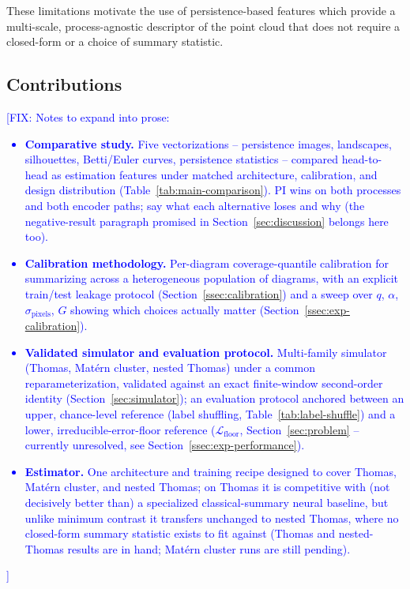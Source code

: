 \documentclass[11pt,letterpaper]{article}
\newcommand{\1}{\mathds{1}}
\newcommand{\fix}[1]{\textcolor{blue}{[FIX: #1]}}
\theoremstyle{plain}
\theoremstyle{definitioncolon}
\begin{document}
These limitations motivate the use of persistence-based features which provide a
multi-scale, process-agnostic descriptor of the point cloud that does not require
a closed-form or a choice of summary statistic.

\subsection{Contributions}
\label{ssec:contributions}
\fix{Notes to expand into prose:
\begin{itemize}
    \item \textbf{Comparative study.} Five vectorizations -- persistence
    images, landscapes, silhouettes, Betti/Euler curves, persistence
    statistics -- compared head-to-head as estimation features under matched
    architecture, calibration, and design distribution
    (Table~\ref{tab:main-comparison}). PI wins on both processes and both
    encoder paths; say what each alternative loses and why (the
    negative-result paragraph promised in Section~\ref{sec:discussion} belongs
    here too).
    \item \textbf{Calibration methodology.} Per-diagram coverage-quantile
    calibration for summarizing across a heterogeneous population of
    diagrams, with an explicit train/test leakage protocol
    (Section~\ref{ssec:calibration}) and a sweep over $q$, $\alpha$,
    $\sigma_{\text{pixels}}$, $G$ showing which choices actually matter
    (Section~\ref{ssec:exp-calibration}).
    \item \textbf{Validated simulator and evaluation protocol.} Multi-family
    simulator (Thomas, Mat\'ern cluster, nested Thomas) under a common
    reparameterization, validated against an exact finite-window second-order
    identity (Section~\ref{sec:simulator}); an evaluation protocol anchored
    between an upper, chance-level reference (label shuffling,
    Table~\ref{tab:label-shuffle}) and a lower, irreducible-error-floor
    reference ($\mathcal{L}_{\text{floor}}$, Section~\ref{sec:problem} --
    currently unresolved, see Section~\ref{ssec:exp-performance}).
    \item \textbf{Estimator.} One architecture and training recipe designed to
    cover Thomas, Mat\'ern cluster, and nested Thomas; on Thomas it is
    competitive with (not decisively better than) a specialized
    classical-summary neural baseline, but unlike minimum contrast it
    transfers unchanged to nested Thomas, where no closed-form summary
    statistic exists to fit against (Thomas and nested-Thomas results are in
    hand; Mat\'ern cluster runs are still pending).
\end{itemize}
}
\end{document}
